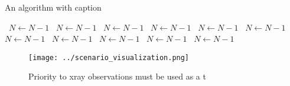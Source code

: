 \documentclass[a4paper]{article}
\begin{document}
\begin{algorithm}
\caption{An algorithm with caption}
\begin{algorithmic}
\    \State $N \gets N - 1$
\    \State $N \gets N - 1$
\    \State $N \gets N - 1$
\    \State $N \gets N - 1$
\    \State $N \gets N - 1$
\    \State $N \gets N - 1$
\    \State $N \gets N - 1$
\    \State $N \gets N - 1$
\    \State $N \gets N - 1$
\    \State $N \gets N - 1$
\    \State $N \gets N - 1$
\EndWhile
\end{algorithmic}
\end{algorithm}

\begin{figure}
\centering
\texttt{[image: ../scenario\_visualization.png]}
\caption{Priority to xray observations must be used as a t
}
\end{figure}
 
\end{document}
